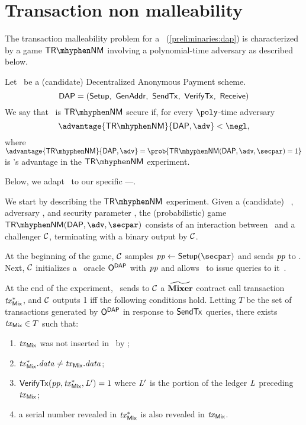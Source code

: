 

\chapter{Transaction non malleability}\label{appendix:trnm}

The transaction malleability problem for a \dapscheme~(\cref{preliminaries:dap}) is characterized by a game $\trnm$ involving a polynomial-time adversary \adv{} as described below.

\begin{definition}
Let \dapscheme~be a (candidate) Decentralized Anonymous Payment scheme.
\[
  \dapscheme = (\setup,\ \genadd,\ \sendtx,\ \verifytx,\ \receive)
\]
We say that \dapscheme~is $\trnm$ secure if, for every $\poly$-time adversary \adv~
\[
    \advantage{\trnm}{\dapscheme, \adv} < \negl,
\]
where $\advantage{\trnm}{\dapscheme ,\adv} = \prob{\trnm(\dapscheme, \adv, \secpar) = 1}$ is \adv’s advantage in the $\trnm$ experiment.
\end{definition}

Below, we adapt~\cite[Appendix C.2]{sasson2014zerocash} to our specific \dapscheme---\zeth.

We start by describing the $\trnm$ experiment.
Given a (candidate) \zeth~\dapscheme, adversary \adv, and security parameter \secpar, the (probabilistic) game $\trnm(\dapscheme, \adv, \secpar)$ consists of an interaction between \adv~and a challenger $\mathcal{C}$, terminating with a binary output by $\mathcal{C}$.

At the beginning of the game, $\mathcal{C}$ samples $\pparams \gets \setup(\secpar)$ and sends $\mathit{pp}$ to \adv. Next, $\mathcal{C}$ initializes a \dapscheme~oracle $\mathsf{O}^{\mathsf{DAP}}$ with $\mathit{pp}$ and allows \adv~to issue queries to it~\cite[Appendix B]{zethpaper}.

At the end of the experiment, \adv~sends to $\mathcal{C}$ a $\widetilde{\mathbf{Mixer}}$ contract call transaction $\mathit{tx}^*_{\mathsf{Mix}}$, and $\mathcal{C}$ outputs 1 iff the following conditions hold. Letting $T$ be the set of transactions generated by $\mathsf{O}^{\mathsf{DAP}}$ in response to $\mathsf{SendTx}$ queries, there exists $\mathit{tx}_{\mathsf{Mix}} \in T$ such that:
\begin{enumerate}
    \item $\mathit{tx}_{\mathsf{Mix}}$ was not inserted in \ledger~by \adv;
    \item $\mathit{tx}^*_{\mathsf{Mix}}.\mathit{data} \neq \mathit{tx}_{\mathsf{Mix}}.\mathit{data}$;
    \item $\mathsf{VerifyTx}(\mathit{pp}, \mathit{tx}^*_{\mathsf{Mix}}, \mathit{L}') = 1$ where $\mathit{L}'$ is the portion of the ledger $\mathit{L}$ preceding $\mathit{tx}_{\mathsf{Mix}}$;
    \item a serial number revealed in $\mathit{tx}^*_{\mathsf{Mix}}$ is also revealed in $\mathit{tx}_{\mathsf{Mix}}$.
\end{enumerate}

